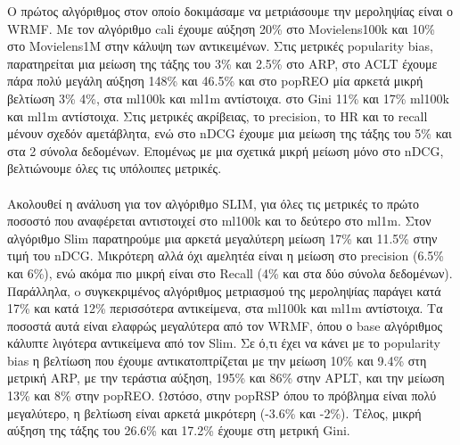 \noindent Ο πρώτος αλγόριθμος στον οποίο δοκιμάσαμε να μετριάσουμε την μεροληψίας είναι ο WRMF. Με τον αλγόριθμο cali έχουμε αύξηση 20\% στο Movielens100k και 10\% στο Movielens1M στην κάλυψη των αντικειμένων. Στις μετρικές popularity bias, παρατηρείται μια μείωση της τάξης του 3\% και 2.5\% στο ARP, στο ACLT έχουμε πάρα πολύ μεγάλη αύξηση 148\% και 46.5\% και στο popREO μία αρκετά μικρή βελτίωση 3\% 4\%, στα ml100k και ml1m αντίστοιχα. στο Gini 11\% και 17\% ml100k και ml1m αντίστοιχα. Στις μετρικές ακρίβειας, το precision, το HR και το recall μένουν σχεδόν αμετάβλητα, ενώ στο nDCG έχουμε μια μείωση της τάξης του 5\% και στα 2 σύνολα δεδομένων. Επομένως με μια σχετικά μικρή μείωση μόνο στο nDCG, βελτιώνουμε όλες τις υπόλοιπες μετρικές. \\\\
Ακολουθεί η ανάλυση για τον αλγόριθμο SLIM, για όλες τις μετρικές το πρώτο ποσοστό που αναφέρεται αντιστοιχεί στο ml100k και το δεύτερο στο ml1m. Στον αλγόριθμο Slim παρατηρούμε μια αρκετά μεγαλύτερη μείωση 17\% και 11.5\% στην τιμή του nDCG. Μικρότερη αλλά όχι αμελητέα είναι η μείωση στο precision (6.5\% και 6\%), ενώ ακόμα πιο μικρή είναι στο Recall (4\% και στα δύο σύνολα δεδομένων). Παράλληλα, o συγκεκριμένος αλγόριθμος μετριασμού της μεροληψίας παράγει κατά 17\% και κατά 12\% περισσότερα αντικείμενα, στα ml100k και ml1m αντίστοιχα. Τα ποσοστά αυτά είναι ελαφρώς μεγαλύτερα από τον WRMF, όπου ο base αλγόριθμος κάλυπτε λιγότερα αντικείμενα από τον Slim. Σε ό,τι έχει να κάνει με το popularity bias  η βελτίωση που έχουμε αντικατοπτρίζεται με την μείωση  10\% και 9.4\% στη μετρική ARP, με την τεράστια αύξηση, 195\% και 86\% στην APLT, και την μείωση 13\% και 8\% στην popREO. Ωστόσο, στην popRSP όπου το πρόβλημα είναι πολύ μεγαλύτερο, η βελτίωση είναι αρκετά μικρότερη (-3.6\% και -2\%). Τέλος, μικρή αύξηση της τάξης του 26.6\% και 17.2\% έχουμε στη μετρική Gini.\\
